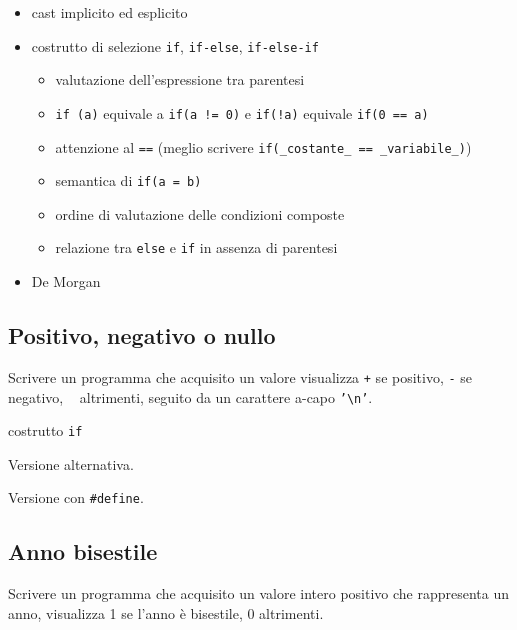 \begin{itemize}
\item cast implicito ed esplicito
\item costrutto di selezione \texttt{if}, \texttt{if-else}, \texttt{if-else-if}
    \begin{itemize}
    \item valutazione dell'espressione tra parentesi
    \item \texttt{if (a)} equivale a \texttt{if(a != 0)} e \texttt{if(!a)} equivale \texttt{if(0 == a)} 
    \item attenzione al \texttt{==} (meglio scrivere \texttt{if(\_costante\_ == \_variabile\_)})
    \item semantica di \texttt{if(a = b)}
    \item ordine di valutazione delle condizioni composte
    \item relazione tra \texttt{else} e \texttt{if} in assenza di parentesi
    \end{itemize}
\item De Morgan
\end{itemize}

\mysep{}

\subsection{Positivo, negativo o nullo}
Scrivere un programma che acquisito un valore visualizza \texttt{+} se positivo, \texttt{-} se negativo, \texttt{\ } altrimenti, seguito da un carattere a-capo \texttt{'\textbackslash n'}.

\begin{tags}
costrutto \texttt{if}
\end{tags}


Versione alternativa.


Versione con \texttt{\#define}.


\subsection{Anno bisestile}
Scrivere un programma che acquisito un valore intero positivo che rappresenta un anno, visualizza 1 se l'anno \`e bisestile, 0 altrimenti.

